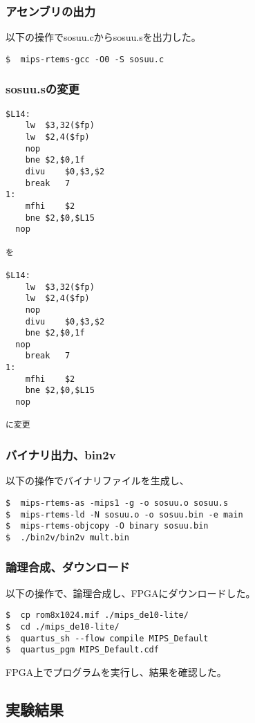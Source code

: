 \subsubsection{アセンブリの出力}
以下の操作でsosuu.cからsosuu.sを出力した。
\begin{lstlisting}[caption={アセンブリの出力},label={アセンブリの出力}]
$  mips-rtems-gcc -O0 -S sosuu.c
\end{lstlisting}

\subsubsection{sosuu.sの変更}
\begin{lstlisting}[caption={sosuu.sの変更},label={sosuu.sの変更}]
$L14:
	lw	$3,32($fp)
	lw	$2,4($fp)
	nop
	bne	$2,$0,1f
	divu	$0,$3,$2
	break	7
1:
	mfhi	$2
	bne	$2,$0,$L15
  nop
  
を

$L14:
	lw	$3,32($fp)
	lw	$2,4($fp)
	nop
	divu	$0,$3,$2
	bne	$2,$0,1f
  nop
	break	7
1:
	mfhi	$2
	bne	$2,$0,$L15
  nop

に変更
\end{lstlisting}

\subsubsection{バイナリ出力、bin2v}
以下の操作でバイナリファイルを生成し、
\begin{lstlisting}[caption={アセンブリの出力、クロスコンパイル},label={アセンブリの出力}]
$  mips-rtems-as -mips1 -g -o sosuu.o sosuu.s 
$  mips-rtems-ld -N sosuu.o -o sosuu.bin -e main
$  mips-rtems-objcopy -O binary sosuu.bin 
$  ./bin2v/bin2v mult.bin
\end{lstlisting}

\subsubsection{論理合成、ダウンロード}
以下の操作で、論理合成し、FPGAにダウンロードした。
\begin{lstlisting}[caption={論理合成、ダウンロード},label={論理合成、ダウンロード9}]
$  cp rom8x1024.mif ./mips_de10-lite/
$  cd ./mips_de10-lite/
$  quartus_sh --flow compile MIPS_Default
$  quartus_pgm MIPS_Default.cdf
\end{lstlisting}

FPGA上でプログラムを実行し、結果を確認した。

\subsection{実験結果}

